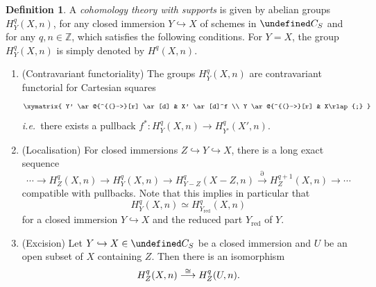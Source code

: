 \documentclass[10pt,a4paper]{article}
\let\cal\undefined
\numberwithin{equation}{section}
\newtheorem{Key lemma}[theorem]{Key lemma}
\theoremstyle{definition}
\newtheorem{definition}[theorem]{Definition}
\theoremstyle{remark}
\newcommand{\bb}{\mathbb}
\newcommand{\To}{\longrightarrow}
\newcommand{\cal}{\mathcal}
\newcommand{\xTo}[1]{\stackrel{#1}{\To}}
\newcommand{\red}{\mathrm{red}}
\def\lowcong{\vbox to 0pt{\vss\hbox{$\scriptstyle\cong$}\vskip-1.2pt}}
\begin{document}
\begin{definition}\label{def.HTD}
A \textit{cohomology theory with supports} is given by abelian groups $H^q_Y(X,n)$, for any closed immersion $Y\hookrightarrow X$ of schemes in $\cal C_S$ and for any $q,n\in \bb Z$,
which satisfies the following conditions. For $Y=X$, the group $H^q_Y(X,n)$ is simply denoted by
$H^q(X,n)$. 
\begin{enumerate}
\item (Contravariant functoriality) The groups $H^q_Y(X,n)$ are contravariant functorial for Cartesian squares
\[
\xymatrix{
Y' \ar@{^{(}->}[r] \ar[d] & X' \ar[d]^f \\
Y \ar@{^{(}->}[r]  & X\rlap{;}
}
\]
\textit{i.e.}~there exists a pullback $f^*\colon H^q_Y(X,n) \to H^q_{Y'}(X',n)$.

\item\label{def.HTD-2} (Localisation)\label{pullback.locseq} For closed immersions $Z\hookrightarrow Y\hookrightarrow X$, there is a long exact sequence 
\[
\cdots \To H^q_Z(X,n) \To H^q_Y(X,n) \To H^q_{Y-Z}(X-Z,n) \stackrel{\partial}{\To} H^{q+1}_Z(X,n)\To \cdots
\]
compatible with pullbacks. Note that this implies in particular that
\[
H^q_Y(X,n) \simeq H^q_{Y_{\red}}(X,n)
\]
for a closed immersion $Y\hookrightarrow X$ and the reduced part $Y_{\red}$ of $Y$.

\item\label{def.HTD-3} (Excision) Let $Y\hookrightarrow X\in \cal C_S$ be a closed immersion and $U$ be an open subset of $X$ containing $Z$. Then there is an isomorphism 
  $$
  H^q_Z(X,n)\xTo{\lowcong}H^q_Z(U,n).
  $$
\end{enumerate}
\end{definition}
\end{document}
